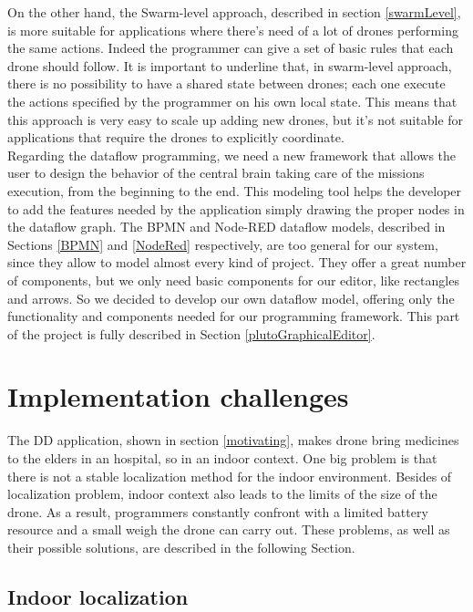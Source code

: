 On the other hand, the Swarm-level approach, described in section \ref{swarmLevel}, is more suitable for applications where there’s need of a lot of drones performing the same actions.
Indeed the programmer can give a set of basic rules that each drone should follow. It is important to underline that, in swarm-level approach, there is no possibility to have a shared state between drones; each one execute the actions specified by the programmer on his own local state. This means that this approach is very easy to scale up adding new drones, but it’s not suitable for applications that require the drones to explicitly coordinate.
\\

Regarding the dataflow programming, we need a new framework that allows the user to design the behavior of the central brain taking care of the missions execution, from the beginning to the end. 
This modeling tool helps the developer to add the features needed by the application simply drawing the proper nodes in the dataflow graph. 
The BPMN and Node-RED dataflow models, described in Sections \ref{BPMN} and \ref{NodeRed} respectively, are too general for our system, since they allow to model almost every kind of project.
They offer a great number of components, but we only need basic components for our editor, like rectangles and arrows.
So we decided to develop our own dataflow model, offering only the functionality and components needed for our programming framework.
This part of the project is fully described in Section \ref{plutoGraphicalEditor}.

\section {Implementation challenges}\label{challenges}

The DD application, shown in section \ref{motivating}, makes drone bring medicines to the elders in an hospital, so in an indoor context.
One big problem is that there is not a stable localization method for the indoor environment.
Besides of localization problem, indoor context also leads to the limits of the size of the drone.
As a result, programmers constantly confront with a limited battery resource and a small weigh the drone can carry out. These problems, as well as their possible solutions, are described in the following Section.

\subsection{Indoor localization}

